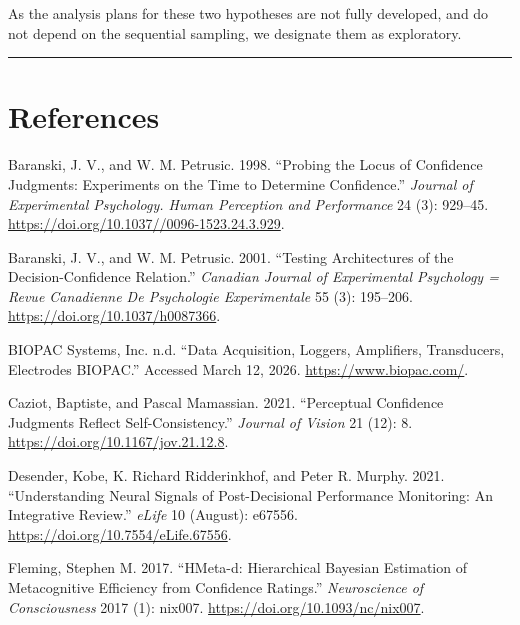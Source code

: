 \documentclass[
]{article}
\newlength{\cslhangindent}
\newenvironment{CSLReferences}[2] %
 {\begin{list}{}{%
  \setlength{\itemindent}{0pt}
  \setlength{\leftmargin}{0pt}
  \setlength{\parsep}{0pt}
  \ifodd #1
   \setlength{\leftmargin}{\cslhangindent}
   \setlength{\itemindent}{-1\cslhangindent}
  \fi
  \setlength{\itemsep}{#2\baselineskip}}}
 {\end{list}}
\begin{document}
As the analysis plans for these two hypotheses are not fully developed,
and do not depend on the sequential sampling, we designate them as
exploratory.

\begin{center}\rule{0.5\linewidth}{0.5pt}\end{center}

\section{References}\label{references}

\label{refs}
\begin{CSLReferences}{1}{1}
Baranski, J. V., and W. M. Petrusic. 1998. {``Probing the Locus of
Confidence Judgments: Experiments on the Time to Determine
Confidence.''} \emph{Journal of Experimental Psychology. Human
Perception and Performance} 24 (3): 929--45.
\url{https://doi.org/10.1037//0096-1523.24.3.929}.

Baranski, J. V., and W. M. Petrusic. 2001. {``Testing Architectures of
the Decision-Confidence Relation.''} \emph{Canadian Journal of
Experimental Psychology = Revue Canadienne De Psychologie Experimentale}
55 (3): 195--206. \url{https://doi.org/10.1037/h0087366}.

BIOPAC Systems, Inc. n.d. {``Data {Acquisition}, {Loggers},
{Amplifiers}, {Transducers}, {Electrodes} \textbar{} {BIOPAC}.''}
Accessed March 12, 2026. \url{https://www.biopac.com/}.

Caziot, Baptiste, and Pascal Mamassian. 2021. {``Perceptual Confidence
Judgments Reflect Self-Consistency.''} \emph{Journal of Vision} 21 (12):
8. \url{https://doi.org/10.1167/jov.21.12.8}.

Desender, Kobe, K. Richard Ridderinkhof, and Peter R. Murphy. 2021.
{``Understanding Neural Signals of Post-Decisional Performance
Monitoring: {An} Integrative Review.''} \emph{eLife} 10 (August):
e67556. \url{https://doi.org/10.7554/eLife.67556}.

Fleming, Stephen M. 2017. {``{HMeta-d}: Hierarchical {Bayesian}
Estimation of Metacognitive Efficiency from Confidence Ratings.''}
\emph{Neuroscience of Consciousness} 2017 (1): nix007.
\url{https://doi.org/10.1093/nc/nix007}.


\end{CSLReferences}
\end{document}
